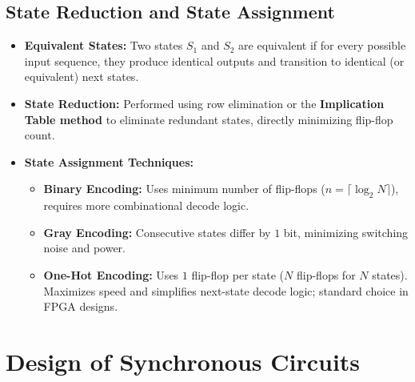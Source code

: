 \documentclass[12pt,a4paper]{article}
\begin{document}
\begin{tcolorbox}[tikzbox, title={Block Diagrams: Moore Machine vs. Mealy Machine}]
\end{tcolorbox}

\subsection{State Reduction and State Assignment}
\begin{itemize}[leftmargin=*, itemsep=3pt]
  \item \textbf{Equivalent States:} Two states $S_1$ and $S_2$ are equivalent if for every possible input sequence, they produce identical outputs and transition to identical (or equivalent) next states.
  \item \textbf{State Reduction:} Performed using row elimination or the \textbf{Implication Table method} to eliminate redundant states, directly minimizing flip-flop count.
  \item \textbf{State Assignment Techniques:}
    \begin{itemize}
      \item \textbf{Binary Encoding:} Uses minimum number of flip-flops ($n = \lceil\log_2 N\rceil$), requires more combinational decode logic.
      \item \textbf{Gray Encoding:} Consecutive states differ by $1$ bit, minimizing switching noise and power.
      \item \textbf{One-Hot Encoding:} Uses $1$ flip-flop per state ($N$ flip-flops for $N$ states). Maximizes speed and simplifies next-state decode logic; standard choice in FPGA designs.
    \end{itemize}
\end{itemize}

\section{Design of Synchronous Circuits}
\end{document}
